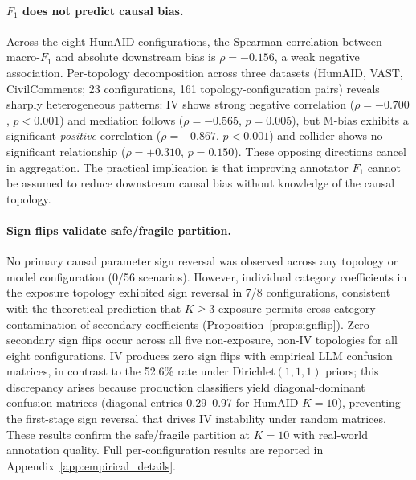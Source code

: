 \paragraph{$F_1$ does not predict causal bias.}
Across the eight HumAID configurations, the Spearman correlation between macro-$F_1$ and absolute downstream bias is $\rho{=}{-}0.156$, a weak negative association. Per-topology decomposition across three datasets (HumAID, VAST, CivilComments; 23 configurations, 161 topology-configuration pairs) reveals sharply heterogeneous patterns: IV shows strong negative correlation ($\rho{=}{-}0.700$, $p{<}0.001$) and mediation follows ($\rho{=}{-}0.565$, $p{=}0.005$), but M-bias exhibits a significant \emph{positive} correlation ($\rho{=}{+}0.867$, $p{<}0.001$) and collider shows no significant relationship ($\rho{=}{+}0.310$, $p{=}0.150$). These opposing directions cancel in aggregation. The practical implication is that improving annotator $F_1$ cannot be assumed to reduce downstream causal bias without knowledge of the causal topology.

\paragraph{Sign flips validate safe/fragile partition.}
No primary causal parameter sign reversal was observed across any topology or model configuration (0/56 scenarios). However, individual category coefficients in the exposure topology exhibited sign reversal in 7/8 configurations, consistent with the theoretical prediction that $K{\geq}3$ exposure permits cross-category contamination of secondary coefficients (Proposition~\ref{prop:signflip}). Zero secondary sign flips occur across all five non-exposure, non-IV topologies for all eight configurations. IV produces zero sign flips with empirical LLM confusion matrices, in contrast to the 52.6\% rate under Dirichlet$(1,1,1)$ priors; this discrepancy arises because production classifiers yield diagonal-dominant confusion matrices (diagonal entries 0.29--0.97 for HumAID $K{=}10$), preventing the first-stage sign reversal that drives IV instability under random matrices. These results confirm the safe/fragile partition at $K{=}10$ with real-world annotation quality. Full per-configuration results are reported in Appendix~\ref{app:empirical_details}.
